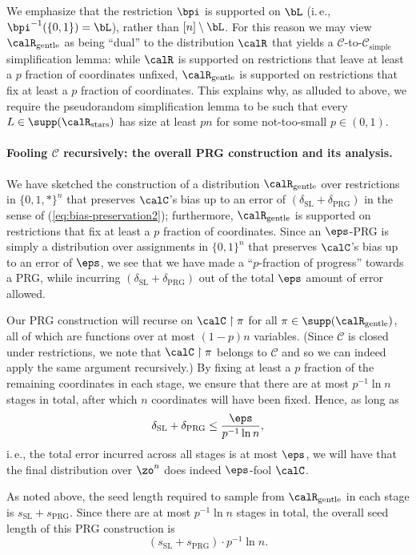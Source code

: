 \documentclass[11pt]{article}
\numberwithin{equation}{section}
\theoremstyle{definition}
\theoremstyle{plain}
\newcommand{\ie}{i.\,e.}
\theoremstyle{plain}
\newcommand{\uhr}{\upharpoonright}
\newcommand{\simple}{\mathrm{simple}}
\newcommand{\stars}{\mathrm{stars}}
\newcommand{\gentle}{\mathrm{gentle}}
\newcommand{\PRG}{\mathrm{PRG}}
\newcommand{\SL}{\mathrm{SL}}
\begin{document}
We emphasize that the restriction $\bpi$ is supported on $\bL$ (\ie, $\bpi^{-1}(\{0,1\}) = \bL$), rather than $[n] \setminus \bL$.  For this reason we may view $\calR_\gentle$ as being ``dual'' to the distribution $\calR$ that yields a $\mathscr{C}$-to-$\mathscr{C}_\simple$ simplification lemma: while $\calR$ is supported on restrictions that leave at least a $p$ fraction of coordinates unfixed, $\calR_\gentle$ is supported on restrictions that fix at least a $p$ fraction of coordinates. This  explains why,  as alluded to above, we  require the pseudorandom simplification lemma to be such that every $L \in \supp(\calR_\stars)$ has size at least $pn$ for some not-too-small $p\in (0,1)$. 

\vspace{-5pt} 

\paragraph{Fooling $\mathscr{C}$ recursively: the overall PRG construction and its analysis.}  We have sketched the construction of a distribution $\calR_\gentle$ over restrictions in $\{0,1,\ast\}^n$ that preserves $\calC$'s bias up to an error of $(\delta_\SL + \delta_\PRG)$ in the sense of (\ref{eq:bias-preservation2}); furthermore, $\calR_\gentle$ is supported on restrictions that fix at least a $p$ fraction of coordinates. Since an $\eps$-PRG is simply a distribution over assignments in $\{0,1\}^n$ that preserves $\calC$'s bias up to an error of $\eps$, we see that we have made a ``$p$-fraction of progress'' towards a PRG, while incurring $(\delta_\SL + \delta_\PRG)$ out of the total $\eps$ amount of error allowed. 

Our PRG construction will recurse on $\calC \uhr \pi$ for all $\pi \in \supp(\calR_\gentle)$, all of which are functions over at most $(1-p)n$ variables. (Since $\mathscr{C}$ is closed under restrictions, we note that $\calC \uhr \pi$ belongs to $\mathscr{C}$ and so we can indeed apply the same argument recursively.)  By fixing at least a $p$ fraction of the remaining coordinates in each stage, we ensure that there are at most $p^{-1}\ln n$ stages in total, after which $n$ coordinates will have been fixed. Hence, as long as 
\[ \delta_\SL + \delta_\PRG \le \frac{\eps}{p^{-1}\ln n}, \] 
\ie, the total error incurred across all stages is at most $\eps$, we will have that the final distribution over $\zo^n$ does indeed $\eps$-fool $\calC$. 

As noted above, the seed length required to sample from $\calR_\gentle$ in each stage is $s_\SL + s_\PRG$. Since there are at most $p^{-1}\ln n$ stages in total, the overall seed length of this PRG construction is 
\[ (s_\SL + s_\PRG) \cdot p^{-1}\ln n.\] 
\end{document}

